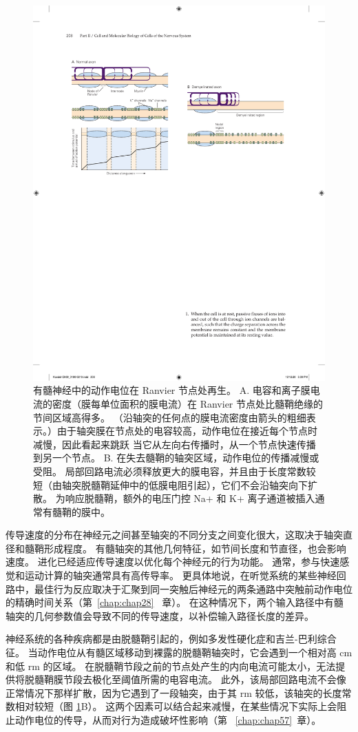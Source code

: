 \begin{figure}[htbp]
	\centering
	\includegraphics[width=0.5\linewidth]{chap09/fig_9_13}
	\caption{有髓神经中的动作电位在 Ranvier 节点处再生。 A. 电容和离子膜电流的密度（膜每单位面积的膜电流）在 Ranvier 节点处比髓鞘绝缘的节间区域高得多。 （沿轴突的任何点的膜电流密度由箭头的粗细表示。）由于轴突膜在节点处的电容较高，动作电位在接近每个节点时减慢，因此看起来跳跃 当它从左向右传播时，从一个节点快速传播到另一个节点。 B. 在失去髓鞘的轴突区域，动作电位的传播减慢或受阻。 局部回路电流必须释放更大的膜电容，并且由于长度常数较短（由轴突脱髓鞘延伸中的低膜电阻引起），它们不会沿轴突向下扩散。 为响应脱髓鞘，额外的电压门控 Na+ 和 K+ 离子通道被插入通常有髓鞘的膜中。}
	\label{fig:9_13}
\end{figure}


传导速度的分布在神经元之间甚至轴突的不同分支之间变化很大，这取决于轴突直径和髓鞘形成程度。
有髓轴突的其他几何特征，如节间长度和节直径，也会影响速度。
进化已经适应传导速度以优化每个神经元的行为功能。 
通常，参与快速感觉和运动计算的轴突通常具有高传导率。
更具体地说，在听觉系统的某些神经回路中，最佳行为反应取决于汇聚到同一突触后神经元的两条通路中突触前动作电位的精确时间关系（第~\ref{chap:chap28}~ 章）。
在这种情况下，两个输入路径中有髓轴突的几何参数值会导致不同的传导速度，以补偿输入路径长度的差异。


神经系统的各种疾病都是由脱髓鞘引起的，例如多发性硬化症和吉兰-巴利综合征。
当动作电位从有髓区域移动到裸露的脱髓鞘轴突时，它会遇到一个相对高 cm 和低 rm 的区域。
在脱髓鞘节段之前的节点处产生的内向电流可能太小，无法提供将脱髓鞘膜节段去极化至阈值所需的电容电流。
此外，该局部回路电流不会像正常情况下那样扩散，因为它遇到了一段轴突，由于其 rm 较低，该轴突的长度常数相对较短（图 \ref{fig:9_13}B）。
这两个因素可以结合起来减慢，在某些情况下实际上会阻止动作电位的传导，从而对行为造成破坏性影响（第 ~\ref{chap:chap57}~章）。

